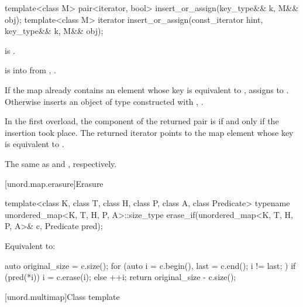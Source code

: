 %
\begin{itemdecl}
template<class M>
  pair<iterator, bool> insert_or_assign(key_type&& k, M&& obj);
template<class M>
  iterator insert_or_assign(const_iterator hint, key_type&& k, M&& obj);
\end{itemdecl}

\begin{itemdescr}
\pnum
\mandates
{} is .

\expects
{} is  into 
from , .

\pnum
\effects
If the map already contains an element 
whose key is equivalent to ,
assigns  to .
Otherwise inserts an object of type 
constructed with , .

\pnum
\returns
In the first overload,
the  component of the returned pair is 
if and only if the insertion took place.
The returned iterator points to the map element
whose key is equivalent to .

\pnum
\complexity
The same as  and ,
respectively.
\end{itemdescr}

[unord.map.erasure]{Erasure}

%
\begin{itemdecl}
template<class K, class T, class H, class P, class A, class Predicate>
  typename unordered_map<K, T, H, P, A>::size_type
    erase_if(unordered_map<K, T, H, P, A>& c, Predicate pred);
\end{itemdecl}

\begin{itemdescr}
\pnum
\effects
Equivalent to:
\begin{codeblock}
auto original_size = c.size();
for (auto i = c.begin(), last = c.end(); i != last; ) {
  if (pred(*i)) {
    i = c.erase(i);
  } else {
    ++i;
  }
}
return original_size - c.size();
\end{codeblock}
\end{itemdescr}

[unord.multimap]{Class template }%

